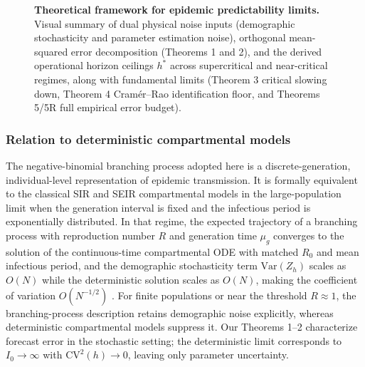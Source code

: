 \documentclass[review]{elsarticle}
\theoremstyle{plain}
\theoremstyle{definition}
\begin{document}
\begin{figure}[htbp]
{%
}
\caption{\textbf{Theoretical framework for epidemic predictability limits.} Visual summary of dual physical noise inputs (demographic stochasticity and parameter estimation noise), orthogonal mean-squared error decomposition (Theorems 1 and 2), and the derived operational horizon ceilings $h^*$ across supercritical and near-critical regimes, along with fundamental limits (Theorem 3 critical slowing down, Theorem 4 Cram\'er--Rao identification floor, and Theorems 5/5R full empirical error budget).}
\label{fig:framework}
\end{figure}

\subsubsection{Relation to deterministic compartmental models}

The negative-binomial branching process adopted here is a discrete-generation, individual-level representation of epidemic transmission. It is formally equivalent to the classical SIR and SEIR compartmental models \citep{kermack1927contribution} in the large-population limit when the generation interval is fixed and the infectious period is exponentially distributed. In that regime, the expected trajectory of a branching process with reproduction number $R$ and generation time $\mu_g$ converges to the solution of the continuous-time compartmental ODE with matched $R_0$ and mean infectious period, and the demographic stochasticity term $\text{Var}(Z_h)$ scales as $O(N)$ while the deterministic solution scales as $O(N)$, making the coefficient of variation $O(N^{-1/2})$ \citep{ethier1986markov}. For finite populations or near the threshold $R \approx 1$, the branching-process description retains demographic noise explicitly, whereas deterministic compartmental models suppress it. Our Theorems 1--2 characterize forecast error in the stochastic setting; the deterministic limit corresponds to $I_0 \to \infty$ with $\text{CV}^2(h) \to 0$, leaving only parameter uncertainty.
\end{document}
